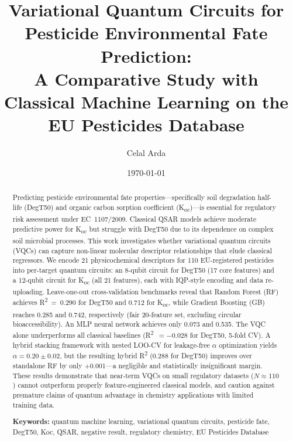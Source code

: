 \documentclass[12pt,a4paper]{article}
\newcommand{\degtl}{DegT50}
\newcommand{\koc}{K\textsubscript{oc}}
\newcommand{\rtwo}{R\textsuperscript{2}}
\begin{document}
\title{Variational Quantum Circuits for Pesticide Environmental Fate Prediction:\\
       A Comparative Study with Classical Machine Learning on the EU Pesticides Database}

\author{Celal Arda }

\date{\today}
\maketitle

\begin{abstract}
Predicting pesticide environmental fate properties---specifically soil
degradation half-life (\degtl{}) and organic carbon sorption coefficient
(\koc{})---is essential for regulatory risk assessment under EC~1107/2009.
Classical QSAR models achieve moderate predictive power for \koc{} but
struggle with \degtl{} due to its dependence on complex soil microbial
processes. This work investigates whether variational quantum circuits (VQCs)
can capture non-linear molecular descriptor relationships that elude
classical regressors. We encode 21 physicochemical descriptors for
110 EU-registered pesticides into per-target quantum circuits: an
8-qubit circuit for \degtl{} (17 core features) and a 12-qubit circuit
for \koc{} (all 21 features), each with IQP-style encoding and data
re-uploading. Leave-one-out cross-validation benchmarks reveal that
Random Forest (RF) achieves \rtwo{}~=~0.290 for \degtl{} and 0.712 for
\koc{}, while Gradient Boosting (GB) reaches 0.285 and 0.742,
respectively (fair 20-feature set, excluding circular bioaccessibility). An MLP neural network achieves only 0.073 and 0.535.
The VQC alone underperforms all classical baselines
(\rtwo{}~$= -0.028$ for \degtl{}, 5-fold CV). A hybrid stacking
framework with nested LOO-CV for leakage-free $\alpha$ optimization
yields $\alpha = 0.20 \pm 0.02$, but the resulting hybrid \rtwo{}
(0.288 for \degtl{}) improves over standalone RF by only +0.001---a
negligible and statistically insignificant margin. These results
demonstrate that near-term VQCs on small regulatory datasets
($N \approx 110$) cannot outperform properly feature-engineered classical
models, and caution against premature claims of quantum advantage in
chemistry applications with limited training data.

\vspace{6pt}
\noindent\textbf{Keywords:} quantum machine learning, variational quantum
circuits, pesticide fate, DegT50, Koc, QSAR, negative result, regulatory
chemistry, EU Pesticides Database
\end{abstract}
\end{document}
